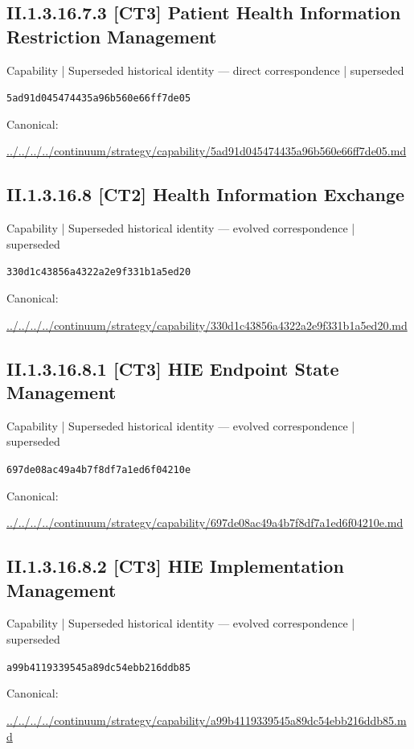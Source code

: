 \documentclass[10pt,a4paper]{article}
\begin{document}
\subsection*{II.1.3.16.7.3 [CT3] Patient Health Information Restriction Management}
{\small Capability | Superseded historical identity — direct correspondence | superseded}\par
\texttt{5ad91d045474435a96b560e66ff7de05}\par
Canonical: \par
{\footnotesize\url{../../../../continuum/strategy/capability/5ad91d045474435a96b560e66ff7de05.md}}\par
\subsection*{II.1.3.16.8 [CT2] Health Information Exchange}
{\small Capability | Superseded historical identity — evolved correspondence | superseded}\par
\texttt{330d1c43856a4322a2e9f331b1a5ed20}\par
Canonical: \par
{\footnotesize\url{../../../../continuum/strategy/capability/330d1c43856a4322a2e9f331b1a5ed20.md}}\par
\subsection*{II.1.3.16.8.1 [CT3] HIE Endpoint State Management}
{\small Capability | Superseded historical identity — evolved correspondence | superseded}\par
\texttt{697de08ac49a4b7f8df7a1ed6f04210e}\par
Canonical: \par
{\footnotesize\url{../../../../continuum/strategy/capability/697de08ac49a4b7f8df7a1ed6f04210e.md}}\par
\subsection*{II.1.3.16.8.2 [CT3] HIE Implementation Management}
{\small Capability | Superseded historical identity — evolved correspondence | superseded}\par
\texttt{a99b4119339545a89dc54ebb216ddb85}\par
Canonical: \par
{\footnotesize\url{../../../../continuum/strategy/capability/a99b4119339545a89dc54ebb216ddb85.md}}\par
\end{document}
